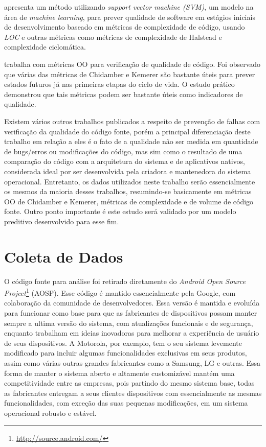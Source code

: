  apresenta um método utilizando \textit{support vector machine (SVM)}, um modelo na área de \textit{machine learning}, para prever qualidade de software em estágios iniciais de desenvolvimento baseado em métricas de complexidade de código, usando \textit{LOC} e outras métricas como métricas de complexidade de Halstead e complexidade ciclomática.

 trabalha com métricas OO para verificação de qualidade de código. Foi observado que várias das métricas de Chidamber e Kemerer são bastante úteis para prever estados futuros já nas primeiras etapas do ciclo de vida. O estudo prático demonstrou que tais métricas podem ser bastante úteis como indicadores de qualidade.

Existem vários outros trabalhos publicados a respeito de prevenção de falhas com verificação da qualidade do código fonte, porém a principal diferenciação deste trabalho em relação a eles é o fato de a qualidade não ser medida em quantidade de bugs/erros ou modificações do código, mas sim como o resultado de uma comparação do código com a arquitetura do sistema e de aplicativos nativos, considerada ideal por ser desenvolvida pela criadora e mantenedora do sistema operacional. Entretanto, os dados utilizados neste trabalho serão essencialmente os mesmos da maioria desses trabalhos, resumindo-se basicamente em métricas OO de Chidamber e Kemerer, métricas de complexidade e de volume de código fonte. Outro ponto importante é este estudo será validado por um modelo preditivo desenvolvido para esse fim.

\section{Coleta de Dados}

O código fonte para análise foi retirado diretamente do \textit{Android Open Source Project}\footnote{\url{http://source.android.com/}}  (AOSP). Esse código é mantido essencialmente pela Google, com colaboração da comunidade de desenvolvedores. Essa versão é mantida e evoluída para funcionar como base para que as fabricantes de dispositivos possam manter sempre a ultima versão do sistema, com atualizações funcionais e de segurança, enquanto trabalham em ideias inovadoras para melhorar a experiência de usuário de seus dispositivos. A Motorola, por exemplo, tem o seu sistema levemente modificado para incluir algumas funcionalidades exclusivas em seus produtos, assim como várias outras grandes fabricantes como a Samsung, LG e outras.  Essa forma de manter o sistema aberto e altamente customizável mantém uma competitividade entre as empresas, pois partindo do mesmo sistema base, todas as fabricantes entregam a seus clientes dispositivos com essencialmente as mesmas funcionalidades, com exceção das suas pequenas modificações, em um sistema operacional robusto e estável.

